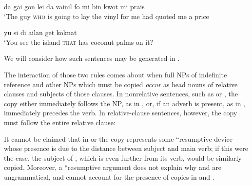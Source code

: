 \ea\label{ex:73}
 da gai gon lei da vainil fo mi bin kwot mi prais\\
\glt  `The guy \textsc{who} is going to lay the vinyl for me had quoted me a price
\z

\ea\label{ex:74}
yu si di ailan get koknat\\
\glt `You see the island \textsc{that} has coconut palms on it?
\z

\noindent We will consider how such sentences may be generated in .

The interaction of those two rules comes about when full NPs of indefinite reference and other NPs which must be copied \textit{occur} as head nouns of relative clauses and subjects of those clauses. In non\-relative sentences, such as  or , the copy either immediately follows the NP, as in , or, if an adverb is present, as in , immediately precedes the verb. In relative-clause sentences, however, the copy must follow the entire relative clause:

\z

\z

\z

\z

\z

\z

\z

\z

It cannot be claimed that in  or  the copy represents some ``resumptive device whose presence is due to the distance be\-tween subject and main verb; if this were the case, the subject of , which is even further from its verb, would be similarly copied. More\-over, a ``resumptive argument does not explain why  and  are ungrammatical, and cannot account for the presence of copies in
 and .

